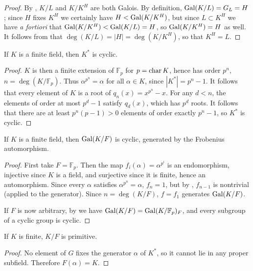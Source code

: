 \begin{proof} By , $K/L$ and $K/K^H$ are both Galois.  By
definition, $\operatorname{\text{Gal}}(K/L) = G_L = H$; since $H$ fixes $K^H$ we certainly have
$H < \operatorname{\text{Gal}}(K/K^H)$, but since $L \subset K^H$ we have \emph{a fortiori} that
$\operatorname{\text{Gal}}(K/K^H) < \operatorname{\text{Gal}}(K/L) = H$, so $\operatorname{\text{Gal}}(K/K^H) = H$ as well.  It follows
from  that $\deg(K/L) = |H| = \deg(K/K^H)$, so that $K^H =
L$. \end{proof}

\begin{lemma} If $K$ is a finite field, then $K^\ast$ is cyclic.
\label{fin_cyclic}
\end{lemma}

\begin{proof} $K$ is then a finite extension of $\mathbb{F}_p$ for $p =
\operatorname{\text{char}}{K}$, hence has order $p^n$, $n = \deg(K/\mathbb{F}_p)$.  Thus
$\alpha^{p^n} = \alpha$ for all $\alpha \in K$, since $|K^\ast| = p^n - 1$.
It follows that every element of $K$ is a root of $q_n(x) = x^{p^n} - x$.  For
any $d < n$, the elements of order at most $p^d - 1$ satisfy $q_d(x)$, which has
$p^d$ roots.  It follows that there are at least $p^n(p - 1) > 0$ elements of
order exactly $p^n - 1$, so $K^\ast$ is cyclic. \end{proof}

\begin{corollary} If $K$ is a finite field, then $\operatorname{\text{Gal}}(K/F)$ is cyclic, generated by
the Frobenius automorphism.
\label{fin_gal_cyclic}
\end{corollary}

\begin{proof} First take $F = \mathbb{F}_p$.  Then the map $f_i(\alpha) =
\alpha^{p^i}$ is an endomorphism, injective since $K$ is a field, and
surjective since it is finite, hence an automorphism.  Since every $\alpha$
satisfies $\alpha^{p^n} = \alpha$, $f_n = 1$, but by , $f_{n -
1}$ is nontrivial (applied to the generator).  Since $n = \deg(K/F)$, $f =
f_1$ generates $\operatorname{\text{Gal}}(K/F)$.

If $F$ is now arbitrary, by  we have $\operatorname{\text{Gal}}(K/F) =
\operatorname{\text{Gal}}(K/\mathbb{F}_p)_F$, and every subgroup of a cyclic group is cyclic.
\end{proof}

\begin{corollary} If $K$ is finite, $K/F$ is primitive.
\label{fin_prim_elt}
\end{corollary}

\begin{proof} No element of $G$ fixes the generator $\alpha$ of $K^\ast$, so
it cannot lie in any proper subfield.  Therefore $F(\alpha) = K$. \end{proof}

